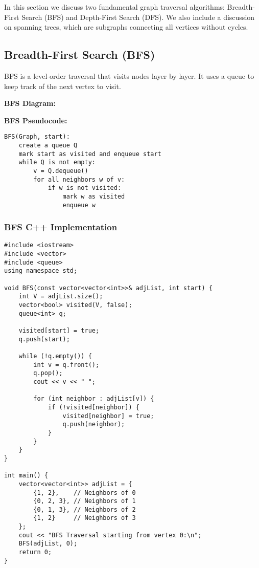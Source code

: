 In this section we discuss two fundamental graph traversal algorithms: Breadth-First Search (BFS) and Depth-First Search (DFS). We also include a discussion on spanning trees, which are subgraphs connecting all vertices without cycles.

\subsection{Breadth-First Search (BFS)}
BFS is a level-order traversal that visits nodes layer by layer. It uses a queue to keep track of the next vertex to visit.

\textbf{BFS Diagram:}
\begin{center}
\end{center}

\textbf{BFS Pseudocode:}
\begin{lstlisting}
BFS(Graph, start):
    create a queue Q
    mark start as visited and enqueue start
    while Q is not empty:
        v = Q.dequeue()
        for all neighbors w of v:
            if w is not visited:
                mark w as visited
                enqueue w
\end{lstlisting}

\subsubsection{BFS C++ Implementation}
\begin{lstlisting}[caption={BFS in C++ using an Adjacency List}]
#include <iostream>
#include <vector>
#include <queue>
using namespace std;

void BFS(const vector<vector<int>>& adjList, int start) {
    int V = adjList.size();
    vector<bool> visited(V, false);
    queue<int> q;

    visited[start] = true;
    q.push(start);

    while (!q.empty()) {
        int v = q.front();
        q.pop();
        cout << v << " ";

        for (int neighbor : adjList[v]) {
            if (!visited[neighbor]) {
                visited[neighbor] = true;
                q.push(neighbor);
            }
        }
    }
}

int main() {
    vector<vector<int>> adjList = {
        {1, 2},    // Neighbors of 0
        {0, 2, 3}, // Neighbors of 1
        {0, 1, 3}, // Neighbors of 2
        {1, 2}     // Neighbors of 3
    };
    cout << "BFS Traversal starting from vertex 0:\n";
    BFS(adjList, 0);
    return 0;
}
\end{lstlisting}


